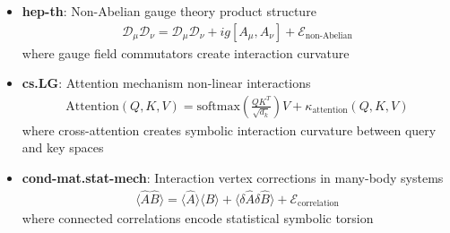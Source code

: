 \begin{theorem}
\begin{itemize}
\item \textbf{hep-th}: Non-Abelian gauge theory product structure
  \begin{align}
  \mathcal{D}_\mu \mathcal{D}_\nu = \mathcal{D}_\mu \mathcal{D}_\nu + ig[A_\mu, A_\nu] + \mathcal{E}_{\text{non-Abelian}}
  \end{align}
  where gauge field commutators create interaction curvature
  
\item \textbf{cs.LG}: Attention mechanism non-linear interactions
  \begin{align}
  \text{Attention}(Q, K, V) = \text{softmax}\left(\frac{QK^T}{\sqrt{d_k}}\right)V + \kappa_{\text{attention}}(Q, K, V)
  \end{align}
  where cross-attention creates symbolic interaction curvature between query and key spaces
  
\item \textbf{cond-mat.stat-mech}: Interaction vertex corrections in many-body systems
  \begin{align}
  \langle \hat{A} \hat{B} \rangle = \langle \hat{A} \rangle \langle \hat{B} \rangle + \langle \delta\hat{A} \delta\hat{B} \rangle + \mathcal{E}_{\text{correlation}}
  \end{align}
  where connected correlations encode statistical symbolic torsion
\end{itemize}
\end{theorem}

